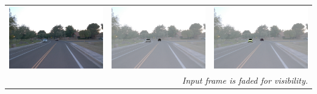 \begin{table}[t]
\begin{subtable}[t]{0.485\linewidth}
{\begin{tabular}{@{}c@{\hskip .1cm}c@{\hskip .1cm}c@{}}
    \includegraphics[width=.5\columnwidth, trim={22cm 16.68cm 30cm 18cm},clip]{fig/rebuttal_optimization/gt/82_60_gt_img.png} &
    \includegraphics[width=.5\columnwidth, trim={22cm 16.68cm 30cm 18cm},clip]{fig/rebuttal_optimization/sched/82_60_shed.png} &
    \includegraphics[width=.5\columnwidth, trim={22cm 16.68cm 30cm 18cm},clip]{fig/rebuttal_optimization/no_sched/82_60_no_shed.png}\\
    \multicolumn{3}{r}{\textit{Input frame is faded for visibility.}}
    \end{tabular}
}
    \vspace*{-6pt}
\label{fig:opt_scheduler}
\end{subtable}
\vspace*{-12pt}
\end{table}



